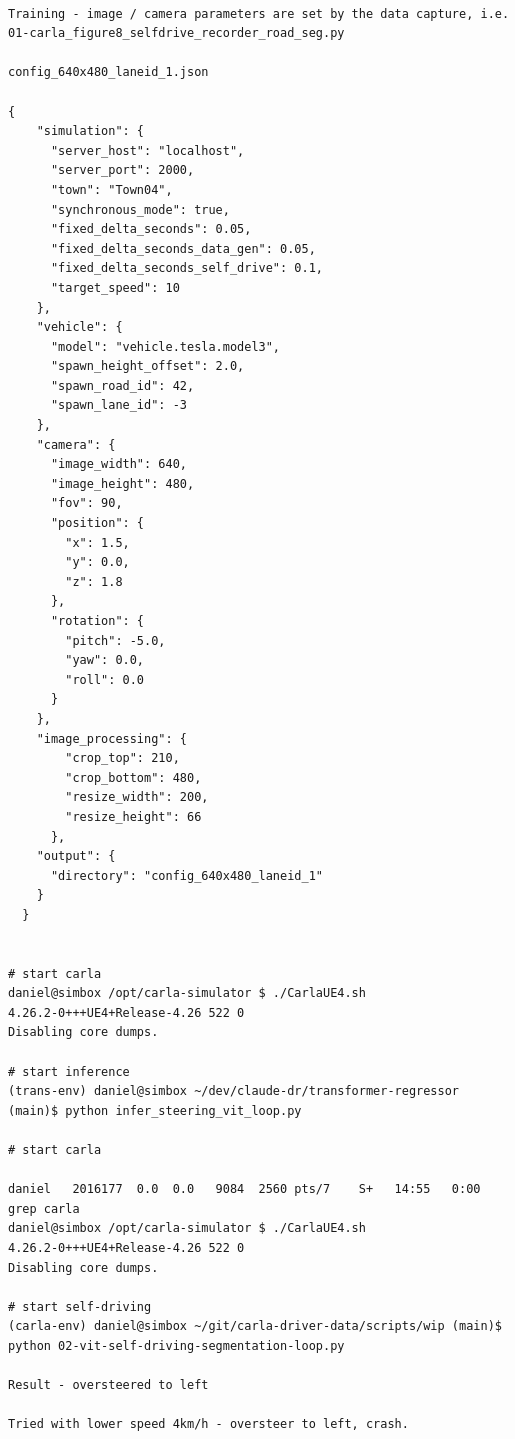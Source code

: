 \begin{verbatim}

Training - image / camera parameters are set by the data capture, i.e. 01-carla_figure8_selfdrive_recorder_road_seg.py

config_640x480_laneid_1.json

{
    "simulation": {
      "server_host": "localhost",
      "server_port": 2000,
      "town": "Town04",
      "synchronous_mode": true,
      "fixed_delta_seconds": 0.05,
      "fixed_delta_seconds_data_gen": 0.05,
      "fixed_delta_seconds_self_drive": 0.1,      
      "target_speed": 10
    },
    "vehicle": {
      "model": "vehicle.tesla.model3",
      "spawn_height_offset": 2.0,
      "spawn_road_id": 42,
      "spawn_lane_id": -3      
    },
    "camera": {
      "image_width": 640,
      "image_height": 480,
      "fov": 90,
      "position": {
        "x": 1.5,
        "y": 0.0,
        "z": 1.8
      },
      "rotation": {
        "pitch": -5.0,
        "yaw": 0.0,
        "roll": 0.0
      }
    },
    "image_processing": {
        "crop_top": 210,
        "crop_bottom": 480,
        "resize_width": 200,
        "resize_height": 66	
      },    
    "output": {
      "directory": "config_640x480_laneid_1"
    }
  }


# start carla
daniel@simbox /opt/carla-simulator $ ./CarlaUE4.sh 
4.26.2-0+++UE4+Release-4.26 522 0
Disabling core dumps.

# start inference
(trans-env) daniel@simbox ~/dev/claude-dr/transformer-regressor (main)$ python infer_steering_vit_loop.py

# start carla

daniel   2016177  0.0  0.0   9084  2560 pts/7    S+   14:55   0:00 grep carla
daniel@simbox /opt/carla-simulator $ ./CarlaUE4.sh 
4.26.2-0+++UE4+Release-4.26 522 0
Disabling core dumps.

# start self-driving
(carla-env) daniel@simbox ~/git/carla-driver-data/scripts/wip (main)$ python 02-vit-self-driving-segmentation-loop.py 

Result - oversteered to left

Tried with lower speed 4km/h - oversteer to left, crash.


\end{verbatim}

